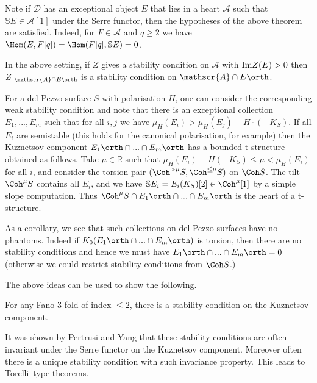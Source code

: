  Note if \(\mathscr{D}\) has an exceptional object \(E\) that lies in a heart
 \(\mathscr{A}\) such that \(\mathbb{S}E\in \mathscr{A}[1]\) under the Serre
 functor, then the hypotheses of the above theorem are satisfied. Indeed,
 for \(F\in \mathscr{A}\) and \(q\geq 2\) we have \(\Hom(E,F[q])=\Hom(F[q],
 \mathbb{S}E)=0\).

\begin{proposition}
    In the above setting, if \(Z\) gives a stability condition on
    \(\mathscr{A}\) with \(\textnormal{Im}Z(E)>0\) then \(Z|_{\mathscr{A}\cap
    E\orth}\) is a stability condition on \(\mathscr{A}\cap E\orth\).
\end{proposition}

\begin{example}
    For a del Pezzo surface \(S\) with polarisation \(H\), one can consider
    the corresponding weak stability condition and note that there is an
    exceptional collection \(E_1,...,E_m\) such that for all \(i,j\) we have
    \(\mu_H(E_i)>\mu_H(E_j)-H\cdot (-K_S)\). If all \(E_i\) are semistable (this
    holds for the canonical polarisation, for example) then the Kuznetsov
    component \(E_1\orth \cap ...
    \cap E_m\orth\) has a bounded t-structure obtained as follows. Take \(\mu\in
    \mathbb{R}\) such that \(\mu_H(E_i)-H(-K_S)\leq \mu<\mu_H(E_i)\) for all
    \(i\), and consider the torsion pair \((\Coh^{{>\mu}}S, \Coh^{\leq \mu}S)\)
    on \(\Coh S\).  The tilt \(\Coh^\mu S\) contains all \(E_i\), and we have
    \(\mathbb{S}E_i = E_i(K_S)[2]\in \Coh^\mu [1]\) by a simple slope
    computation. Thus \(\Coh^\mu S \cap E_1\orth \cap ... \cap E_m\orth\) is the
    heart of a t-structure.

    As a corollary, we see that such collections on del Pezzo surfaces have no
    phantoms. Indeed if \(K_0(E_1\orth \cap ... \cap E_m\orth)\) is torsion, then
    there are no stability conditions and hence we must have \(E_1\orth \cap ...
    \cap E_m\orth = 0\) (otherwise we could restrict stability conditions from
    \(\Coh S\).)
\end{example}

The above ideas can be used to show the following.

\begin{theorem}
    For any Fano 3-fold of index \(\leq 2\), there is a stability condition on
    the Kuznetsov component.
\end{theorem}

It was shown by Pertrusi and Yang that these stability conditions are often
invariant under the Serre functor on the Kuznetsov component. Moreover often
there is a unique stability condition with such invariance property. This leads
to Torelli--type theorems.


